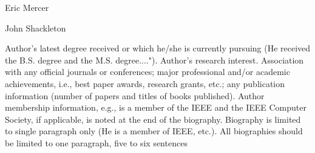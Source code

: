 \begin{IEEEbiography}{Eric Mercer}{\,}  
\end{IEEEbiography}

\begin{IEEEbiography}{John Shackleton}{\,}  
\end{IEEEbiography}

Author's latest degree received or which he/she is currently pursuing (He received the B.S. degree and the M.S. degree...."). Author's research interest. Association with any official journals or conferences; major professional and/or academic achievements, i.e., best paper awards, research grants, etc.; any publication information (number of papers and titles of books published). Author membership information, e.g., is a member of the IEEE and the IEEE Computer Society, if applicable, is noted at the end of the biography. Biography is limited to single paragraph only (He is a member of IEEE, etc.). All biographies should be limited to one paragraph, five to six sentences